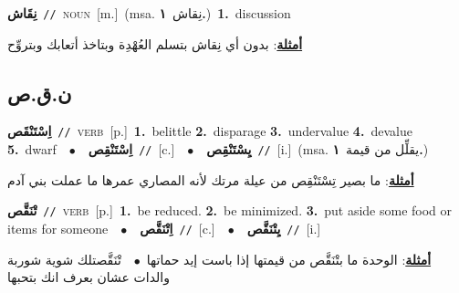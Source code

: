 \documentclass[10pt,a4paper,twoside]{article} %
\begin{document}
\begin{multicols}{2}
{\setlength\topsep{0pt}\textbf{\foreignlanguage{arabic}{نِقَاش}}\ {\color{gray}\texttt{//}\color{black}}\ \textsc{noun}\ [m.]\ \color{gray}(msa. \foreignlanguage{arabic}{نِقاش}~\foreignlanguage{arabic}{\textbf{١.}})\color{black}\ \textbf{1.}~discussion\  \begin{flushright}\color{gray}\foreignlanguage{arabic}{\textbf{\underline{\foreignlanguage{arabic}{أمثلة}}}: بدون أي نِقاش بتسلم العُهْدِة وبتاخذ أتعابك وبتروِّح}\end{flushright}\color{black}} \vspace{2mm}

\vspace{-3mm}
\subsection*{\color{blue}\foreignlanguage{arabic}{ن.ق.ص}\color{blue}{}} 

{\setlength\topsep{0pt}\textbf{\foreignlanguage{arabic}{اِسْتَنْقَص}}\ {\color{gray}\texttt{//}\color{black}}\ \textsc{verb}\ [p.]\ \textbf{1.}~belittle  \textbf{2.}~disparage  \textbf{3.}~undervalue  \textbf{4.}~devalue  \textbf{5.}~dwarf\ \ $\bullet$\ \ \setlength\topsep{0pt}\textbf{\foreignlanguage{arabic}{اِسْتَنْقِص}}\ {\color{gray}\texttt{//}\color{black}}\ [c.]\ \ $\bullet$\ \ \setlength\topsep{0pt}\textbf{\foreignlanguage{arabic}{يِسْتَنْقِص}}\ {\color{gray}\texttt{//}\color{black}}\ [i.]\ \color{gray}(msa. \foreignlanguage{arabic}{يقلِّل من قيمة}~\foreignlanguage{arabic}{\textbf{١.}})\color{black}\  \begin{flushright}\color{gray}\foreignlanguage{arabic}{\textbf{\underline{\foreignlanguage{arabic}{أمثلة}}}: ما بصير تِسْتَنْقِص من عيلة مرتك لأنه المصاري عمرها ما عملت بني آدم}\end{flushright}\color{black}} \vspace{2mm}

{\setlength\topsep{0pt}\textbf{\foreignlanguage{arabic}{تْنَقَّص}}\ {\color{gray}\texttt{//}\color{black}}\ \textsc{verb}\ [p.]\ \textbf{1.}~be reduced.  \textbf{2.}~be minimized.  \textbf{3.}~put aside some food or items for someone\ \ $\bullet$\ \ \setlength\topsep{0pt}\textbf{\foreignlanguage{arabic}{اِتْنَقَّص}}\ {\color{gray}\texttt{//}\color{black}}\ [c.]\ \ $\bullet$\ \ \setlength\topsep{0pt}\textbf{\foreignlanguage{arabic}{يِتْنَقَّص}}\ {\color{gray}\texttt{//}\color{black}}\ [i.]\  \begin{flushright}\color{gray}\foreignlanguage{arabic}{\textbf{\underline{\foreignlanguage{arabic}{أمثلة}}}: الوحدة ما بتْنَقَّص من قيمتها إذا باست إيد حماتها\ $\bullet$\ \  تْنَقَّصتلك شوية شوربة والدات عشان بعرف انك بتحبها}\end{flushright}\color{black}} \vspace{2mm}


\end{multicols}
\end{document}
